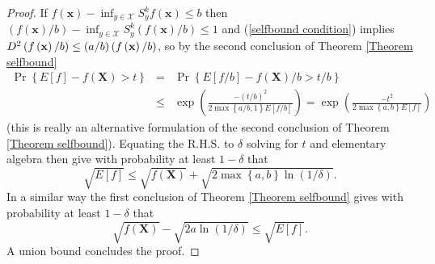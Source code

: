 \documentclass[final,12pt]{colt2018} %
\begin{document}
						
						\begin{proof}
							If $f\left( \mathbf{x}\right) -\inf_{y\in \mathcal{X}}S_{y}^{k}f\left( 
							\mathbf{x}\right) \leq b$ then $\left( f\left( \mathbf{x}\right) /b\right)
							-\inf_{y\in \mathcal{X}}S_{y}^{k}\left( f\left( \mathbf{x}\right) /b\right)
							\leq 1$ and (\ref{selfbound condition}) implies $D^{2}\left( f\left( \mathbf{%
								x}\right) /b\right) \leq \left( a/b\right) \left( f\left( \mathbf{x}\right)
							/b\right) $, so by the second conclusion of Theorem \ref{Theorem selfbound}%
							\begin{eqnarray*}
								\Pr \left\{ E\left[ f\right]-f\left( \mathbf{X}\right) >t\right\}  &=&\Pr
								\left\{ E\left[ f/b\right]-f\left( \mathbf{X}\right) /b >t/b\right\}  \\
								&\leq &\exp \left( \frac{-\left( t/b\right) ^{2}}{2\max \left\{
									a/b,1\right\} E\left[ f/b\right] }\right) =\exp \left( \frac{-t^{2}}{2\max
									\left\{ a,b\right\} E\left[ f\right] }\right) 
							\end{eqnarray*}%
							(this is really an alternative formulation of the second conclusion of
							Theorem \ref{Theorem selfbound}). Equating the R.H.S. to $\delta $ solving
							for $t$ and elementary algebra then give with probability at least $1-\delta 
							$ that%
							\begin{equation*}
							\sqrt{E\left[ f\right] }\leq \sqrt{f\left( \mathbf{X}\right) }+\sqrt{2\max
								\left\{ a,b\right\} \ln \left( 1/\delta \right) }.
							\end{equation*}%
							In a similar way the first conclusion of Theorem \ref{Theorem selfbound}
							gives with probability at least $1-\delta $ that%
							\begin{equation*}
							\sqrt{f\left( \mathbf{X}\right) }-\sqrt{2a\ln \left( 1/\delta \right) }\leq 
							\sqrt{E\left[ f\right] }.
							\end{equation*}%
							A union bound concludes the proof. 
						\end{proof}
						
\end{document}
